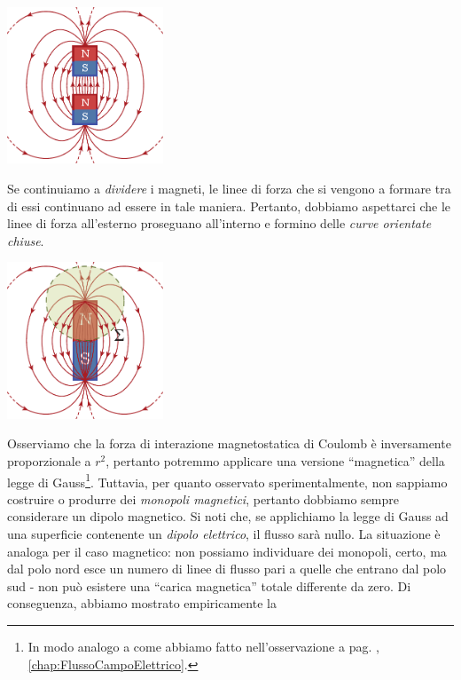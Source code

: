 \begin{center}
	\includegraphics[width=0.35\textwidth]{images/chp7/chp7leggegaussmagneti3.pdf}
\end{center}
Se continuiamo a \textit{dividere} i magneti, le linee di forza che si vengono a formare tra di essi continuano ad essere in tale maniera. Pertanto, dobbiamo aspettarci che le linee di forza all'esterno proseguano all'interno e formino delle \textit{curve orientate chiuse}.
\begin{center}
	\includegraphics[width=0.35\textwidth]{images/chp7/chp7leggegaussmagneti4.pdf}
\end{center}
Osserviamo che la forza di interazione magnetostatica di Coulomb è inversamente proporzionale a $r^2$, pertanto potremmo applicare una versione ``magnetica'' della legge di Gauss\footnote{In modo analogo a come abbiamo fatto nell'osservazione a pag. \pageref{LeggeGaussMoltoGeneralizzata}, \autoref{chap:FlussoCampoElettrico}.}. Tuttavia, per quanto osservato sperimentalmente, non sappiamo costruire o produrre dei \textit{monopoli magnetici}, pertanto dobbiamo sempre considerare un dipolo magnetico.
Si noti che, se applichiamo la legge di Gauss ad una superficie contenente un \textit{dipolo elettrico}, il flusso sarà nullo. La situazione è analoga per il caso magnetico: non possiamo individuare dei monopoli, certo, ma dal polo nord esce un numero di linee di flusso pari a quelle che entrano dal polo sud - non può esistere una ``carica magnetica'' totale differente da zero. Di conseguenza, abbiamo mostrato empiricamente la
